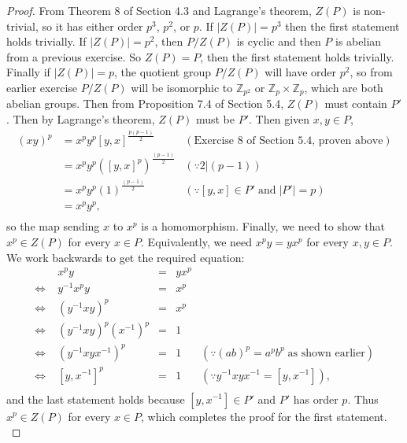 \documentclass{article}
\begin{document}
\begin{enumerate}[label={\bf Q\arabic*:}]
    \begin{proof}
      From Theorem 8 of Section 4.3 and Lagrange's theorem, $Z(P)$ is
      non-trivial, so it has either order $p^3$, $p^2$, or $p$. If
      $|Z(P)|=p^3$ then the first statement holds trivially. If $|Z(P)|=p^2$,
      then $P/Z(P)$ is cyclic and then $P$ is abelian from a previous
      exercise. So $Z(P)=P$, then the first statement holds trivially.
      Finally if $|Z(P)|=p$, the quotient group $P/Z(P)$ will have order
      $p^2$, so from earlier exercise $P/Z(P)$ will be isomorphic to
      $\mathbb{Z}_{p^2}$ or $\mathbb{Z}_{p}\times\mathbb{Z}_{p}$, which are
      both abelian groups. Then from Proposition 7.4 of Section 5.4, $Z(P)$
      must contain $P'$. Then by Lagrange's theorem, $Z(P)$ must be $P'$.
      Then given $x,y\in P$,
      \begin{align*}
        (xy)^p &= x^py^p[y,x]^{\frac{p(p-1)}{2}}  & (\text{Exercise 8 of
               Section 5.4, proven above}) \\
               &= x^py^p([y,x]^p)^{\frac{(p-1)}{2}}  & (\because 2|(p-1)) \\
               &= x^py^p(1)^{\frac{(p-1)}{2}}     & (\because [y,x]\in P'\;
               \text{and}\; |P'|=p) \\
               &= x^py^p,                         & \\
      \end{align*}
      so the map sending $x$ to $x^p$ is a homomorphism. Finally, we need
      to show that $x^p\in Z(P)$ for every $x\in P$. Equivalently,
      we need $x^py=yx^p$ for every $x,y\in P$. We work backwards to get
      the required equation:
      \begin{align*}
                            & x^py                &=& yx^p   & \\
        \Leftrightarrow\;   & y^{-1}x^py          &=& x^p    & \\
        \Leftrightarrow\;   & (y^{-1}xy)^p        &=& x^p    & \\
        \Leftrightarrow\;   & (y^{-1}xy)^p(x^{-1})^p &=& 1    & \\
        \Leftrightarrow\;   & (y^{-1}xyx^{-1})^p  &=& 1    & (\because
          (ab)^p=a^pb^p\; \text{as shown earlier}) \\
        \Leftrightarrow\;   & [y,x^{-1}]^p        &=& 1    & (\because
          y^{-1}xyx^{-1}=[y,x^{-1}]), \\
      \end{align*}
      and the last statement holds because $[y,x^{-1}]\in P'$ and $P'$ has
      order $p$. Thus $x^p\in Z(P)$ for every $x\in P$, which completes the
      proof for the first statement. \\


\end{proof}
\end{enumerate}
\end{document}
